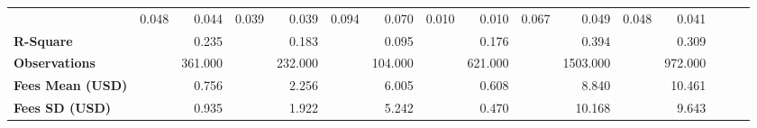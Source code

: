\begin{tabular}{@{\extracolsep{5pt}}lrrrrrrrrrrrrrrr}
{\bf } & 0.048\phantom{***} & 0.044\phantom{***} & 0.039\phantom{***} & 0.039\phantom{***} & 0.094\phantom{***} & 0.070\phantom{***} & 0.010\phantom{***} & 0.010\phantom{***} & 0.067\phantom{***} & 0.049\phantom{***} & 0.048\phantom{***} & 0.041\phantom{***} \\
{\bf R-Square} & \phantom{***} & 0.235\phantom{***} & \phantom{***} & 0.183\phantom{***} & \phantom{***} & 0.095\phantom{***} & \phantom{***} & 0.176\phantom{***} & \phantom{***} & 0.394\phantom{***} & \phantom{***} & 0.309\phantom{***} \\
{\bf Observations} & \phantom{***} & 361.000\phantom{***} & \phantom{***} & 232.000\phantom{***} & \phantom{***} & 104.000\phantom{***} & \phantom{***} & 621.000\phantom{***} & \phantom{***} & 1503.000\phantom{***} & \phantom{***} & 972.000\phantom{***} \\
{\bf Fees Mean (USD)} & \phantom{***} & 0.756\phantom{***} & \phantom{***} & 2.256\phantom{***} & \phantom{***} & 6.005\phantom{***} & \phantom{***} & 0.608\phantom{***} & \phantom{***} & 8.840\phantom{***} & \phantom{***} & 10.461\phantom{***} \\
{\bf Fees SD (USD)} & \phantom{***} & 0.935\phantom{***} & \phantom{***} & 1.922\phantom{***} & \phantom{***} & 5.242\phantom{***} & \phantom{***} & 0.470\phantom{***} & \phantom{***} & 10.168\phantom{***} & \phantom{***} & 9.643\phantom{***} \\
\hline
\end{tabular}

